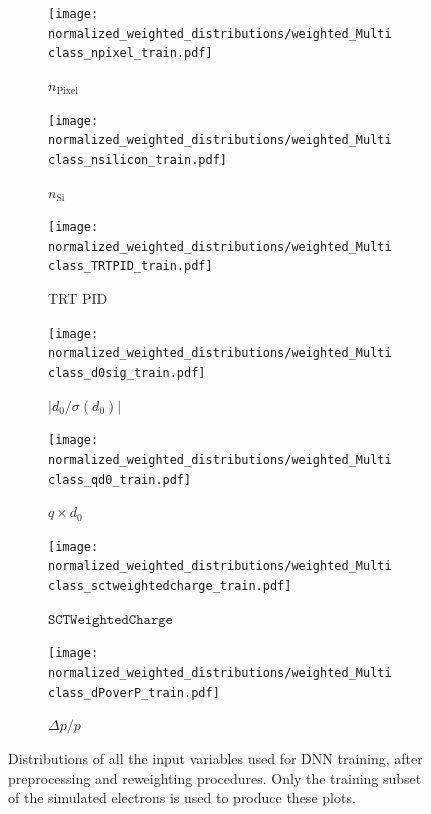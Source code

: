 \begin{figure}[htbp]
  \vspace{0.4cm}
  \begin{subfigure}[b]{0.30\textwidth}
      \centering
      \texttt{[image: normalized\_weighted\_distributions/weighted\_Multiclass\_npixel\_train.pdf]}
      \caption{$n_{\text{Pixel}}$}
      \label{fig:input11}
  \end{subfigure}
  \hfill
  \begin{subfigure}[b]{0.30\textwidth}
      \centering
      \texttt{[image: normalized\_weighted\_distributions/weighted\_Multiclass\_nsilicon\_train.pdf]}
      \caption{$n_{\text{Si}}$}
      \label{fig:input12}
  \end{subfigure}
  \hfill
  \begin{subfigure}[b]{0.30\textwidth}
      \centering
      \texttt{[image: normalized\_weighted\_distributions/weighted\_Multiclass\_TRTPID\_train.pdf]}
      \caption{TRT PID}
      \label{fig:input18}
  \end{subfigure}

  \vspace{0.4cm}
  \begin{subfigure}[b]{0.30\textwidth}
    \centering
    \texttt{[image: normalized\_weighted\_distributions/weighted\_Multiclass\_d0sig\_train.pdf]}
    \caption{$|d_0/\sigma(d_0)|$}
    \label{fig:input16}
  \end{subfigure}
  \hfill
  \begin{subfigure}[b]{0.30\textwidth}
      \centering
      \texttt{[image: normalized\_weighted\_distributions/weighted\_Multiclass\_qd0\_train.pdf]}
      \caption{$q \times d_0$}
      \label{fig:input14}
  \end{subfigure}
  \hfill
  \begin{subfigure}[b]{0.30\textwidth}
      \centering
      \texttt{[image: normalized\_weighted\_distributions/weighted\_Multiclass\_sctweightedcharge\_train.pdf]}
      \caption{$\texttt{SCTWeightedCharge}$}
      \label{fig:input15}
  \end{subfigure}

  \vspace{0.4cm}
  \begin{subfigure}[b]{0.30\textwidth}
      \centering
      \texttt{[image: normalized\_weighted\_distributions/weighted\_Multiclass\_dPoverP\_train.pdf]}
      \caption{$\Delta p/p$}
      \label{fig:input17}
  \end{subfigure}

  \caption{Distributions of all the input variables used for DNN training, after preprocessing and reweighting procedures. Only the training subset of the simulated electrons is used to produce these plots.}
  \label{fig:dnn_inputs_distributions}
\end{figure}

